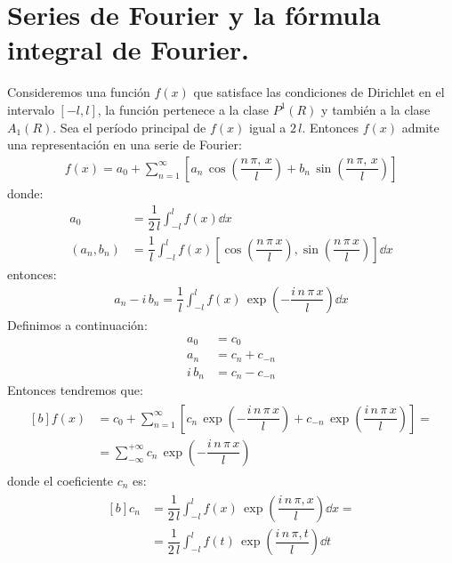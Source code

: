 
\section{Series de Fourier y la fórmula integral de Fourier.}

Consideremos una función $f(x)$ que satisface las condiciones de Dirichlet en el intervalo $[-l, l]$, la función pertenece a la clase $P^{1} (R)$ y también a la clase $A_{1} (R)$. Sea el período principal de $f(x)$ igual a $2 \, l$. Entonces $f(x)$ admite una representación en una serie de Fourier:
\begin{align*}
f(x) = a_{0} + \sum_{n=1}^{\infty} \left[ a_{n} \, \cos \left( \dfrac{n \, \pi, \, x}{l}  \right) + b_{n} \, \sin \left( \dfrac{n \, \pi, \, x}{l}  \right) \right]
\end{align*}
donde:
\begin{align*}
a_{0} &= \dfrac{1}{2 \, l} \int_{-l}^{l} f(x) \dd{x} \\[0.5em]
(a_{n}, b_{n}) &= \dfrac{1}{l} \int_{-l}^{l} f(x) \left[ \cos \left( \dfrac{n \, \pi \, x}{l} \right), \sin \left( \dfrac{n \, \pi \, x}{l} \right) \right] \dd{x}
\end{align*}
entonces:
\begin{align*}
a_{n} - i \, b_{n} = \dfrac{1}{l} \int_{-l}^{l} f(x) \, \exp \left( - \dfrac{i \, n \, \pi \, x}{l} \right) \dd{x}
\end{align*}
Definimos a continuación:
\begin{align*}
a_{0} &= c_{0} \\
a_{n} &= c_{n} + c_{-n} \\
i \, b_{n} &= c_{n} - c_{-n}
\end{align*}
Entonces tendremos que:
\begin{align}
\begin{aligned}[b]
f(x) &= c_{0} + \sum_{n=1}^{\infty} \left[ c_{n} \, \exp \left( -\dfrac{i \, n \, \pi \, x}{l} \right) + c_{-n} \, \exp \left( \dfrac{i \, n \, \pi \, x}{l} \right) \right] = \\[0.5em]
&= \sum_{-\infty}^{+\infty} c_{n} \, \exp \left( - \dfrac{i \, n \, \pi \, x}{l} \right)
\end{aligned}
\label{eq:ecuacion_01_02}
\end{align}
donde el coeficiente $c_{n}$ es:
\begin{align}
\begin{aligned}[b]
c_{n} &= \dfrac{1}{2 \, l} \int_{-l}^{l} f(x) \, \exp \left( \dfrac{i \, n \, \pi, x}{l} \right) \dd{x} = \\[0.5em]
&= \dfrac{1}{2 \, l} \int_{-l}^{l} f(t) \, \exp \left( \dfrac{i \, n \, \pi, t}{l} \right) \dd{t}
\end{aligned}
\label{eq:ecuacion_01_03}
\end{align}
